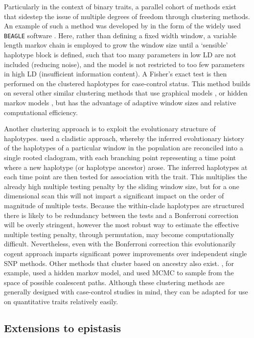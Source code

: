 Particularly in the context of binary traits, a parallel cohort of methods exist that sidestep the issue of multiple degrees of freedom through clustering methods. An example of such a method was developed by \citet{Browning2006} in the form of the widely used {\tt BEAGLE} software \citep{Browning2007}. Here, rather than defining a fixed width window, a variable length markov chain is employed to grow the window size until a `sensible' haplotype block is defined, such that too many parameters in low LD are not included (reducing noise), and the model is not restricted to too few parameters in high LD (insufficient information content). A Fisher's exact test is then performed on the clustered haplotypes for case-control status. This method builds on several other similar clustering methods that use graphical models \citep{Thomas2005}, or hidden markov models \citep{Greenspan2004}, but has the advantage of adaptive window sizes and relative computational efficiency.

Another clustering approach is to exploit the evolutionary structure of haplotypes. \citet{Durrant2004} used a cladistic approach, whereby the inferred evolutionary history of the haplotypes of a particular window in the population are reconciled into a single rooted cladogram, with each branching point representing a time point where a new haplotype (or haplotype ancestor) arose. The inferred haplotypes at each time point are then tested for association with the trait. This multiplies the already high multiple testing penalty by the sliding window size, but for a one dimensional scan this will not impart a significant impact on the order of magnitude of multiple tests. Because the within-clade haplotypes are structured there is likely to be redundancy between the tests and a Bonferroni correction will be overly stringent, however the most robust way to estimate the effective multiple testing penalty, through permutation, may become computationally difficult. Nevertheless, even with the Bonferroni correction this evolutionarily cogent approach imparts significant power improvements over independent single SNP methods. Other methods that cluster based on ancestry also exist. \citet{McPeek1999}, for example, used a hidden markov model, and \citet{Zollner2005} used MCMC to sample from the space of possible coalescent paths. Although these clustering methods are generally designed with case-control studies in mind, they can be adapted for use on quantitative traits relatively easily. 


\subsection{Extensions to epistasis}

